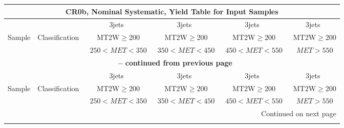 \documentclass{article}
\begin{document}
\begin{longtable}{|l|c|c|c|c|c|} 
 
\multicolumn{6}{c}{ CR0b, Nominal Systematic, Yield Table for Input Samples }\\* \hline 
 &  & 3jets  & 3jets  & 3jets  & 3jets \\* 
Sample & Classification  & ~MT2W$\ge$200  & ~MT2W$\ge$200  & ~MT2W$\ge$200  & ~MT2W$\ge$200 \\* 
 &  & ~$250<MET<350$  & ~$350<MET<450$  & ~$450<MET<550$  & ~$MET>550$ \\* 
\hline \hline 
\endfirsthead 
 
\multicolumn{6}{c}{{\bfseries \tablename\ \thetable{} -- continued from previous page}}\\* \hline 
 &  & 3jets  & 3jets  & 3jets  & 3jets \\* 
Sample & Classification  & ~MT2W$\ge$200  & ~MT2W$\ge$200  & ~MT2W$\ge$200  & ~MT2W$\ge$200 \\* 
 &  & ~$250<MET<350$  & ~$350<MET<450$  & ~$450<MET<550$  & ~$MET>550$ \\* 
\hline \hline 
\endhead 
 
\multicolumn{6}{|r|}{{Continued on next page}}\\* \hline 
\endfoot 
 
 
\endlastfoot 
 

\end{longtable}
\end{document}
